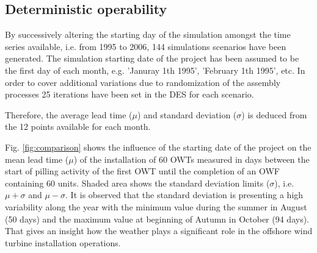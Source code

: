 \subsection{Deterministic operability}
By successively altering the starting day of the simulation amongst the time series available, i.e. from 1995 to 2006, 144 simulations scenarios have been generated. The simulation starting date of the project has been assumed to be the first day of each month, e.g. 'Januray 1th 1995', 'February 1th 1995', etc. In order to cover additional variations due to randomization of the assembly processes 25 iterations have been set in the DES for each scenario.



Therefore, the average lead time ($\mu$) and standard deviation ($\sigma$) is deduced from the 12 points available for each month.

Fig. \ref{fig:comparison} shows the influence of the starting date of the project on the mean lead time ($\mu$) of the installation of 60 OWTs measured in days between the start of pilling activity of the first OWT until the completion of an OWF containing 60 units. Shaded area shows the standard deviation limits ($\sigma$), i.e. $\mu + \sigma$ and $\mu - \sigma$. It is observed that the standard deviation is presenting a high variability along the year with the minimum value during the summer in August (50 days) and the maximum value at beginning of Autumn in October (94 days). That gives an insight how the weather plays a significant role in the offshore wind turbine installation operations.